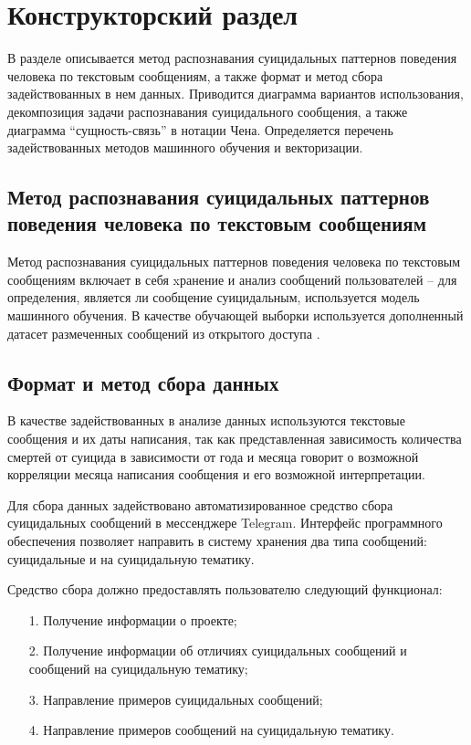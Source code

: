 \section{Конструкторский раздел}

В разделе описывается метод распознавания суицидальных паттернов поведения человека по текстовым сообщениям, а также формат и метод сбора задействованных в нем данных. 
Приводится диаграмма вариантов использования, декомпозиция задачи распознавания суицидального сообщения, а также диаграмма ``сущность-связь'' в нотации Чена. 
Определяется перечень задействованных методов машинного обучения и векторизации.

\subsection{Метод распознавания суицидальных паттернов поведения человека по текстовым сообщениям}

Метод распознавания суицидальных паттернов поведения человека по текстовым сообщениям включает в себя xранение и анализ сообщений пользователей -- для определения, является ли сообщение суицидальным, используется модель машинного обучения. В качестве обучающей выборки используется дополненный датасет размеченных сообщений из открытого доступа \cite{dataset}.

\subsection{Формат и метод сбора данных}

В качестве задействованных в анализе данных используются текстовые сообщения и их даты написания, так как представленная зависимость количества смертей от суицида в зависимости от года и месяца говорит о возможной корреляции месяца написания сообщения и его возможной интерпретации.

Для сбора данных задействовано автоматизированное средство сбора суицидальных сообщений в мессенджере Telegram. Интерфейс программного обеспечения позволяет направить в систему хранения два типа сообщений: суицидальные и на суицидальную тематику.

Средство сбора должно предоставлять пользователю следующий функционал:

\begin{enumerate}
\item[1.] Получение информации о проекте;
\item[2.] Получение информации об отличиях суицидальных сообщений и сообщений на суицидальную тематику;
\item[3.] Направление примеров суицидальных сообщений;
\item[4.] Направление примеров сообщений на суицидальную тематику.
\end{enumerate}

